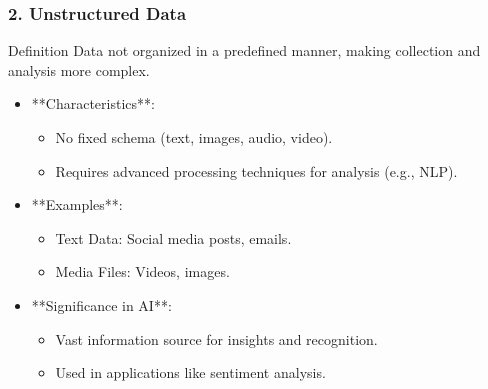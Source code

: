 \documentclass[aspectratio=169]{beamer}
\begin{document}
\begin{frame}[fragile]
    \frametitle{2. Unstructured Data}
    \begin{block}{Definition}
        Data not organized in a predefined manner, making collection and analysis more complex.
    \end{block}
    
    \begin{itemize}
        \item **Characteristics**:
        \begin{itemize}
            \item No fixed schema (text, images, audio, video).
            \item Requires advanced processing techniques for analysis (e.g., NLP).
        \end{itemize}
        
        \item **Examples**:
        \begin{itemize}
            \item Text Data: Social media posts, emails.
            \item Media Files: Videos, images.
        \end{itemize}
        
        \item **Significance in AI**:
        \begin{itemize}
            \item Vast information source for insights and recognition.
            \item Used in applications like sentiment analysis.
        \end{itemize}
    \end{itemize}
\end{frame}
\end{document}
